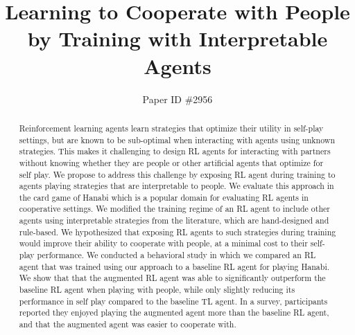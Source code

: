 \documentclass[letterpaper]{article} %
\begin{document}
 
 
\newcount\Comments  %
\newcommand{\kibitz}[2]{\ifnum\Comments=1{\color{#1}{#2}}\fi}
\newcommand{\lel}[1]{\kibitz{blue}{[LEL:#1]}}
\newcommand{\kg}[1]{\kibitz{red}{[KG:#1]}}
\newcommand{\uf}[1]{\kibitz{green}{[UF:#1]}}

 

%
\title{Learning to Cooperate with People by Training with Interpretable Agents}
\author{Paper ID \#2956
}
\maketitle

\begin{abstract} 
Reinforcement learning agents learn   strategies that optimize their utility in self-play settings,
but are known to be sub-optimal when interacting with agents using unknown strategies. This makes it challenging to design RL agents for interacting with partners without knowing whether they are people or other artificial agents that optimize for self play. 
We propose to address this challenge by exposing  RL agent during training to  agents playing  
 strategies that are interpretable to people. 
We evaluate this approach in the  card game of Hanabi which is a popular domain for evaluating RL agents in cooperative settings.
We modified the training regime of 
an  RL agent to include other  agents using   interpretable  strategies from the literature, which are hand-designed and rule-based. 
We hypothesized that exposing  RL agents to such strategies during training would improve their ability to cooperate with people, at a minimal cost to their self-play performance.
We conducted a behavioral study in which we compared an RL agent 
that was trained using our approach to a baseline  RL agent for playing Hanabi. We 
show that that the augmented RL agent was able to significantly outperform the baseline RL agent when playing with people, 
while only slightly reducing its performance in self play compared to the baseline TL agent. In a survey, participants reported they enjoyed playing the augmented agent more than the baseline RL agent, and that the augmented agent was easier to cooperate with. 


\end{abstract}
\end{document}
